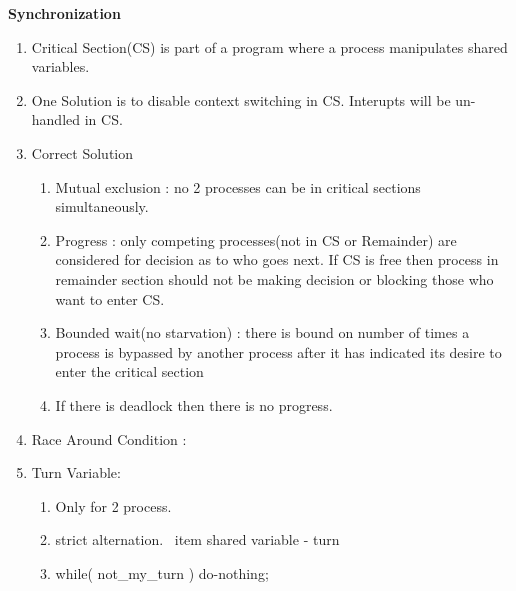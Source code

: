 
\centerline{\textbf{ \LARGE Synchronization}}




\begin{enumerate}

  \item Critical Section(CS) is part of a program where a process manipulates shared variables.
  \item One Solution is to disable context switching in CS. Interupts will be un-handled in CS.
  \item Correct Solution
  \begin{enumerate}
    \item Mutual exclusion : no 2 processes can be in critical sections simultaneously.
    \item Progress : only competing processes(not in CS or Remainder) are considered for decision as to who goes next.
          If CS is free then process in remainder section should not be making decision or blocking those who want to enter CS.
    \item Bounded wait(no starvation) : there is bound on number of times a process is bypassed by another process after
          it has indicated its desire to enter the critical section
    \item If there is deadlock then there is no progress.
  \end{enumerate}
  \item Race Around Condition :

  \item Turn Variable:
  \begin{enumerate}
    \item Only for 2 process.
    \item strict alternation.
    \ item shared variable - turn
    \item while( not\_my\_turn ) do-nothing;
  \end{enumerate}
      \begin{myTableStyle}
        \begin{tabular}{ |m{5cm}|m{5cm}| } \hline
               &        \\ \hline
        \end{tabular}
      \end{myTableStyle}
      \vspace{0.08in}


\end{enumerate}
